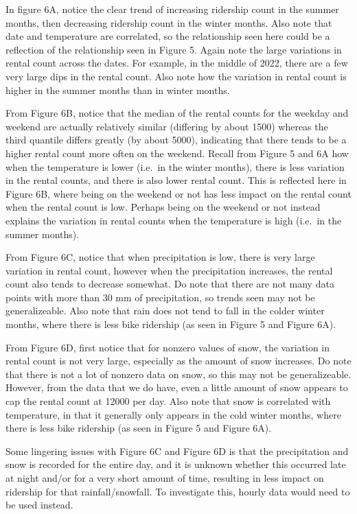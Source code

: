 \documentclass[
]{article}
\begin{document}
In figure 6A, notice the clear trend of increasing ridership count in
the summer months, then decreasing ridership count in the winter months.
Also note that date and temperature are correlated, so the relationship
seen here could be a reflection of the relationship seen in Figure 5.
Again note the large variations in rental count across the dates. For
example, in the middle of 2022, there are a few very large dips in the
rental count. Also note how the variation in rental count is higher in
the summer months than in winter months.

From Figure 6B, notice that the median of the rental counts for the
weekday and weekend are actually relatively similar (differing by about
1500) whereas the third quantile differs greatly (by about 5000),
indicating that there tends to be a higher rental count more often on
the weekend. Recall from Figure 5 and 6A how when the temperature is
lower (i.e.~in the winter months), there is less variation in the rental
counts, and there is also lower rental count. This is reflected here in
Figure 6B, where being on the weekend or not has less impact on the
rental count when the rental count is low. Perhaps being on the weekend
or not instead explains the variation in rental counts when the
temperature is high (i.e.~in the summer months).

From Figure 6C, notice that when precipitation is low, there is very
large variation in rental count, however when the precipitation
increases, the rental count also tends to decrease somewhat. Do note
that there are not many data points with more than 30 mm of
precipitation, so trends seen may not be generalizeable. Also note that
rain does not tend to fall in the colder winter months, where there is
less bike ridership (as seen in Figure 5 and Figure 6A).

From Figure 6D, first notice that for nonzero values of snow, the
variation in rental count is not very large, especially as the amount of
snow increases. Do note that there is not a lot of nonzero data on snow,
so this may not be generalizeable. However, from the data that we do
have, even a little amount of snow appears to cap the rental count at
12000 per day. Also note that snow is correlated with temperature, in
that it generally only appears in the cold winter months, where there is
less bike ridership (as seen in Figure 5 and Figure 6A).

Some lingering issues with Figure 6C and Figure 6D is that the
precipitation and snow is recorded for the entire day, and it is unknown
whether this occurred late at night and/or for a very short amount of
time, resulting in less impact on ridership for that rainfall/snowfall.
To investigate this, hourly data would need to be used instead.
\end{document}
